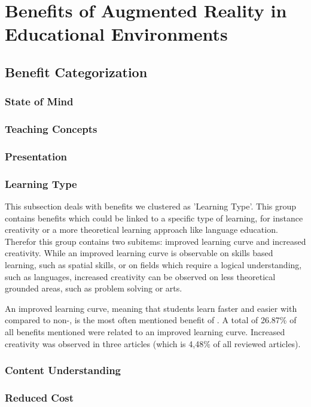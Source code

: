 \section{Benefits of Augmented Reality in Educational Environments}
\subsection{Benefit Categorization}
\label{subsec:Benefits}

% 
\subsubsection{State of Mind}

% 
\subsubsection{Teaching Concepts}

% 
\subsubsection{Presentation}

% 
\subsubsection{Learning Type}
This subsection deals with benefits we clustered as 'Learning Type'. This group contains benefits which could be linked to a specific type of learning, for instance creativity or a more theoretical learning approach like language education. \\
Therefor this group contains two subitems: improved learning curve and increased creativity. While an improved learning curve is observable on skills based learning, such as spatial skills, or on fields which require a logical understanding, such as languages, increased creativity can be observed on less theoretical grounded areas, such as problem solving or arts.

An improved learning curve, meaning that students learn faster and easier with \AR \apps compared to non-\AR \appsns, is the most often mentioned benefit of \ARns. A total of 26.87\% of all benefits mentioned were related to an improved learning curve. 
Increased creativity was observed in three articles (which is 4,48\% of all reviewed articles).
% 
\subsubsection{Content Understanding}

% 
\subsubsection{Reduced Cost}